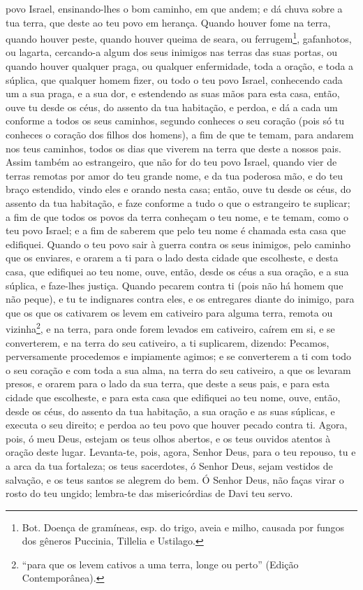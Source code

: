 povo Israel, ensinando-lhes o bom caminho, em que andem; e dá chuva
sobre a tua terra, que deste ao teu povo em herança. Quando
houver fome na terra, quando houver peste, quando houver queima de
seara, ou ferrugem\footnote{Bot. Doença de gramíneas, esp. do trigo,
aveia e milho, causada por fungos dos gêneros Puccinia, Tillelia e
Ustilago.}, gafanhotos, ou lagarta, cercando-a algum dos seus
inimigos nas terras das suas portas, ou quando houver qualquer
praga, ou qualquer enfermidade, toda a oração, e toda a
súplica, que qualquer homem fizer, ou todo o teu povo Israel,
conhecendo cada um a sua praga, e a sua dor, e estendendo as suas
mãos para esta casa, então, ouve tu desde os céus, do assento
da tua habitação, e perdoa, e dá a cada um conforme a todos os seus
caminhos, segundo conheces o seu coração (pois só tu conheces o
coração dos filhos dos homens), a fim de que te temam, para
andarem nos teus caminhos, todos os dias que viverem na terra que
deste a nossos pais. Assim também ao estrangeiro, que não for
do teu povo Israel, quando vier de terras remotas por amor do teu
grande nome, e da tua poderosa mão, e do teu braço estendido, vindo
eles e orando nesta casa; então, ouve tu desde os céus, do
assento da tua habitação, e faze conforme a tudo o que o estrangeiro
te suplicar; a fim de que todos os povos da terra conheçam o teu
nome, e te temam, como o teu povo Israel; e a fim de saberem que
pelo teu nome é chamada esta casa que edifiquei. Quando o teu
povo sair à guerra contra os seus inimigos, pelo caminho que os
enviares, e orarem a ti para o lado desta cidade que escolheste, e
desta casa, que edifiquei ao teu nome, ouve, então, desde os
céus a sua oração, e a sua súplica, e faze-lhes justiça.
Quando pecarem contra ti (pois não há homem que não peque), e
tu te indignares contra eles, e os entregares diante do inimigo,
para que os que os cativarem os levem em cativeiro para alguma
terra, remota ou vizinha\footnote{``para que os levem cativos a uma
terra, longe ou perto'' (Edição Contemporânea).}, e na terra,
para onde forem levados em cativeiro, caírem em si, e se
converterem, e na terra do seu cativeiro, a ti suplicarem, dizendo:
Pecamos, perversamente procedemos e impiamente agimos; e se
converterem a ti com todo o seu coração e com toda a sua alma, na
terra do seu cativeiro, a que os levaram presos, e orarem para o
lado da sua terra, que deste a seus pais, e para esta cidade que
escolheste, e para esta casa que edifiquei ao teu nome, ouve,
então, desde os céus, do assento da tua habitação, a sua oração e as
suas súplicas, e executa o seu direito; e perdoa ao teu povo que
houver pecado contra ti. Agora, pois, ó meu Deus, estejam os
teus olhos abertos, e os teus ouvidos atentos à oração deste lugar.
Levanta-te, pois, agora, Senhor Deus, para o teu repouso, tu
e a arca da tua fortaleza; os teus sacerdotes, ó Senhor Deus, sejam
vestidos de salvação, e os teus santos se alegrem do bem. Ó
Senhor Deus, não faças virar o rosto do teu ungido; lembra-te das
misericórdias de Davi teu servo.

